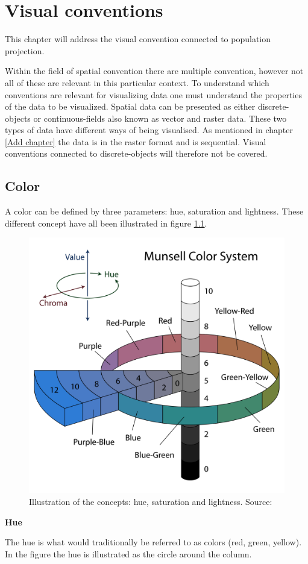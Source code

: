 \chapter{Visual conventions}
This chapter will address the visual convention connected to population projection. 

Within the field of spatial convention there are multiple convention, however not all of these are relevant in this particular context. To understand which conventions are relevant for visualizing data one must understand the properties of the data to be visualized. Spatial data can be presented as either discrete-objects or continuous-fields also known as vector and raster data. \citep{objectsNFields} These two types of data have different ways of being visualised. 
As mentioned in chapter \ref{Add chapter} the data is in the raster format and is sequential. Visual conventions connected to discrete-objects will therefore not be covered.




\section{Color}
A color can be defined by three parameters: hue, saturation and lightness. These different concept have all been illustrated in figure \ref{MunsellColorSystem}.

\begin{figure} [H]
	\centering
	\includegraphics[width=.4\textwidth]{Pictures/MunsellColorSystem}
	\caption{Illustration of the concepts: hue, saturation and lightness. Source: \citet{JacobRus}}
	\label{MunsellColorSystem}
\end{figure}

\textbf{Hue}

The hue is what would traditionally be referred to as colors (red, green, yellow). In the figure the hue is illustrated as the circle around the column.

